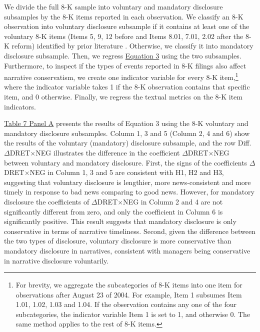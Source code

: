 \documentclass[a4paper]{article}
\begin{document}
\begin{spacing}{2}
We divide the full 8-K sample into voluntary and mandatory disclosure subsamples by the 8-K items reported in each observation. We classify an 8-K observation into voluntary disclosure subsample if it contains at least one of the voluntary 8-K items (Items 5, 9, 12 before and Items 8.01, 7.01, 2.02 after the 8-K reform) identified by prior literature \cite{lermanNewForm8K2010, heMeasuringDisclosureUsing2020}. Otherwise, we classify it into mandatory disclosure subsample. Then, we regress \hyperref[eq3]{Equation 3} using the two subsamples. Furthermore, to inspect if the types of events reported in 8-K filings also affect narrative conservatism, we create one indicator variable for every 8-K item,\footnote{For brevity, we aggregate the subcategories of 8-K items into one item for observations after August 23 of 2004. For example, Item 1 subsumes Item 1.01, 1.02, 1.03 and 1.04. If the observation contains any one of the four subcategories, the indicator variable Item 1 is set to 1, and otherwise 0. The same method applies to the rest of 8-K items.} where the indicator variable takes 1 if the 8-K observation contains that specific item, and 0 otherwise. Finally, we regress the textual metrics on the 8-K item indicators.

\hyperref[T7PA]{Table 7 Panel A} presents the results of Equation 3 using the 8-K voluntary and mandatory disclosure subsamples. Column 1, 3 and 5 (Column 2, 4 and 6) show the results of the voluntary (mandatory) disclosure subsample, and the row Diff. $\Delta$DRET$\times$NEG illustrates the difference in the coefficient $\Delta$DRET$\times$NEG between voluntary and mandatory disclosure. First, the signs of the coefficients $\Delta$DRET$\times$NEG in Column 1, 3 and 5 are consistent with H1, H2 and H3, suggesting that voluntary disclosure is lengthier, more news-consistent and more timely in response to bad news comparing to good news. However, for mandatory disclosure the coefficients of $\Delta$DRET$\times$NEG in Column 2 and 4 are not significantly different from zero, and only the coefficient in Column 6 is significantly positive. This result suggests that mandatory disclosure is only conservative in terms of narrative timeliness. Second, given the difference between the two types of disclosure, voluntary disclosure is more conservative than mandatory disclosure in narratives, consistent with managers being conservative in narrative disclosure voluntarily.


\end{spacing}
\end{document}
